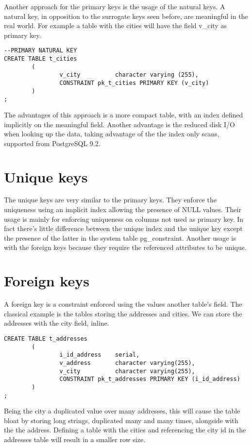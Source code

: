 Another approach for the primary keys is the usage of the natural keys. A natural key, in
opposition to the surrogate keys seen before, are meaningful in the real world. For example a table
with the cities will have the field v\_city as primary key. 

\begin{lstlisting}[style=pgsql]
--PRIMARY NATURAL KEY 
CREATE TABLE t_cities
        (
                v_city          character varying (255),
                CONSTRAINT pk_t_cities PRIMARY KEY (v_city)
        )
;
\end{lstlisting}

The advantages of this approach is a more compact table, with an index defined implicitly on the 
meaningful field. Another advantage is the reduced disk I/O when looking up the data, taking 
advantage of the the index only scans, supported from PostgreSQL 9.2.


\section{Unique keys}
The unique keys are very similar to the primary keys. They enforce the uniqueness using an implicit 
index allowing the presence of NULL values. Their usage is mainly for enforcing uniqueness on 
columns not used as primary key. In fact there's little difference between the unique index and the 
unique key except the presence of the latter in the system table pg\_constraint. Another usage 
is with the foreign keys because they require the referenced attributes to be unique. 
\newpage

\section{Foreign keys}
\label{sec:FKEYS}
A foreign key is a constraint enforced using the values another table's field. The classical 
example is the tables storing the addresses  and cities. We can store the addresses with the city 
field, inline.

\begin{lstlisting}[style=pgsql]
CREATE TABLE t_addresses
        (
                i_id_address    serial,
                v_address       character varying(255),
                v_city          character varying(255),
                CONSTRAINT pk_t_addresses PRIMARY KEY (i_id_address)
        )
;
\end{lstlisting}

Being the city a duplicated value over many addresses, this will cause the table bloat by storing 
long strings, duplicated many and many times, alongside with the the address. Defining a table with 
the cities and referencing the city id in the addresses table will result in a smaller row size. 

